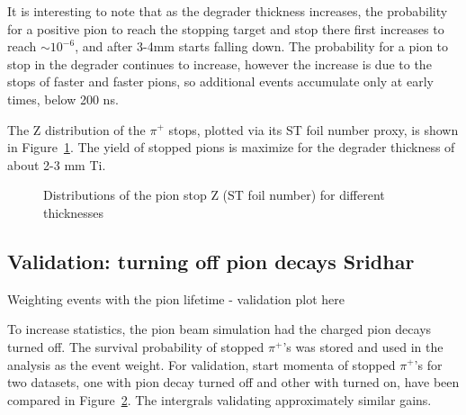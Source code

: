 It is interesting to note that as the degrader thickness increases, the probability for a positive pion
to reach the stopping target and stop there first increases to reach $\sim 10^{-6}$, and after 3-4mm
starts falling down.  The probability for a pion to stop in the degrader continues to increase,
however the increase is due to the stops of faster and faster pions, so additional events accumulate
only at early times, below 200 ns.

The Z distribution of the $\pi^+$ stops, plotted via its ST foil number  proxy, is shown
in Figure~\ref{fig:pion_stop_foil}. The yield of stopped pions is maximize for the degrader
thickness of about 2-3 mm Ti.

\begin{figure}[H]
  \caption{
    \label{fig:pion_stop_foil}
    Distributions of the pion stop Z (ST foil number) for different thicknesses
  }
\end{figure}

\newpage
\subsection {{\red Validation: turning off pion decays  Sridhar}}

Weighting events with the pion lifetime - validation plot here

\begin{figure}[H]
  \caption{
    \label{fig:pion_lifetime}
  }
\end{figure}

To increase statistics, the pion beam simulation had the charged pion decays turned off.
The survival probability of stopped $\pi^+$'s was stored and used in the analysis
as the event weight. For validation, start momenta of stopped $\pi^+$'s for two datasets, one with pion decay turned off and other with turned on, have been compared in Figure~\ref{fig:pion_lifetime}. The intergrals validating approximately similar gains. 

